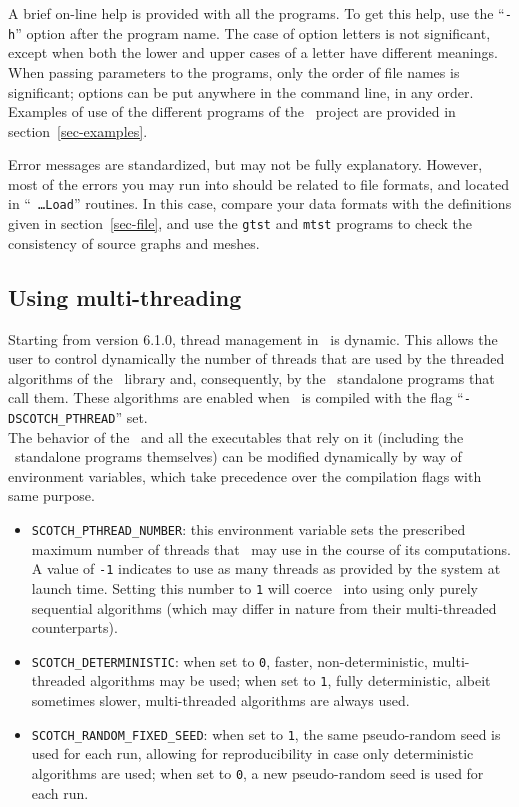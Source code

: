 A brief on-line help is provided with all the programs. To get this help,
use the ``\texttt{-h}'' option after the program name.
The case of option letters is not significant, except when
both the lower and upper cases of a letter have different meanings.
When passing parameters to the programs, only the order of file names is
significant; options can be put anywhere in the command line, in any order.
Examples of use of the different programs of the \scotch\ project are provided
in section~\ref{sec-examples}.

Error messages are standardized, but may not be fully explanatory.
However, most of the errors you may run into should be related to file
formats, and located in ``\mbox{\texttt{ \ldots Load}}'' routines.
In this case, compare your data formats with the definitions
given in section~\ref{sec-file}, and use the \texttt{gtst} and \texttt{mtst}
programs to check the consistency of source graphs and meshes.

\subsection{Using multi-threading}
\label{sec-prog-multithread}

Starting from version \textsc{6.1.0}, thread management in \scotch\ is
dynamic. This allows the user to control dynamically the number of
threads that are used by the threaded algorithms of the
\libscotch\ library and, consequently, by the \scotch\ standalone
programs that call them. These algorithms are enabled when \scotch\ is
compiled with the flag ``\texttt{-DSCOTCH\_\lbt PTHREAD}'' set.
\\

The behavior of the \libscotch\ and all the executables that rely on
it (including the \scotch\ standalone programs themselves) can be
modified dynamically by way of environment variables, which take
precedence over the compilation flags with same purpose.
\begin{itemize}
\item
\texttt{SCOTCH\_PTHREAD\_NUMBER}: this environment variable sets the
prescribed maximum number of threads that \scotch\ may use in the
course of its computations. A value of \texttt{-1} indicates to use as
many threads as provided by the system at launch time. Setting this
number to \texttt{1} will coerce \scotch\ into using only purely
sequential algorithms (which may differ in nature from their
multi-threaded counterparts).
\item
\texttt{SCOTCH\_DETERMINISTIC}: when set to \texttt{0}, faster,
non-deterministic, multi-threaded algorithms may be used; when set to
\texttt{1}, fully deterministic, albeit sometimes slower,
multi-threaded algorithms are always used.
\item
\texttt{SCOTCH\_RANDOM\_FIXED\_SEED}: when set to \texttt{1}, the same
pseudo-random seed is used for each run, allowing for reproducibility
in case only deterministic algorithms are used; when set to
\texttt{0}, a new pseudo-random seed is used for each run.
\end{itemize}

